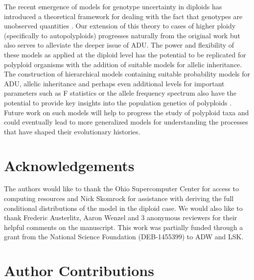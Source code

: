 \documentclass[11pt,english,letterpaper,oneside]{article}
\begin{document}
The recent emergence of models for genotype uncertainty in diploids has introduced a theoretical framework for dealing with the fact that genotypes are unobserved quantities \citep{gompert2012bgc,buerkle2013popModels}. Our extension of this theory to cases of higher ploidy (specifically to autopolyploids) progresses naturally from the original work but also serves to alleviate the deeper issue of ADU. The power and flexibility of these models as applied at the diploid level has the potential to be replicated for polyploid organisms with the addition of suitable models for allelic inheritance. The construction of hierarchical models containing suitable probability models for ADU, allelic inheritance and perhaps even additional levels for important parameters such as F statistics or the allele frequency spectrum also have the potential to provide key insights into the population genetics of polyploids \citep{gompert2011bamova,buerkle2013popModels}. Future work on such models will help to progress the study of polyploid taxa and could eventually lead to more generalized models for understanding the processes that have shaped their evolutionary histories.
\medskip

\section{Acknowledgements}           %

The authors would like to thank the Ohio Supercomputer Center for access to computing resources and Nick Skomrock for assistance with deriving the full conditional distributions of the model in the diploid case. We would also like to thank Frederic Austerlitz, Aaron Wenzel and 3 anonymous reviewers for their helpful comments on the manuscript. This work was partially funded through a grant from the National Science Foundation (DEB-1455399) to ADW and LSK.
\bigskip



\singlespacing




\doublespacing

\section{Author Contributions}        %
\end{document}
